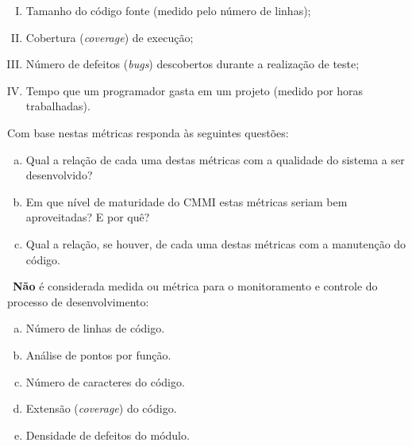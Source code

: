 \begin{enumerate}[I)]
\item Tamanho do código fonte (medido pelo número de linhas);
\item Cobertura ({\em coverage}) de execução;
\item Número de defeitos ({\em bugs}) descobertos durante a realização
  de teste;
\item Tempo que um programador gasta em um projeto (medido por horas trabalhadas).
\end{enumerate}

Com base nestas métricas responda às seguintes questões:

\begin{enumerate}[a)]
\item  Qual a relação de cada uma destas métricas com a qualidade do
  sistema a ser desenvolvido? 
\item Em que nível de maturidade do CMMI estas métricas seriam bem
  aproveitadas? E por quê? 
\item Qual a relação, se houver, de cada uma destas métricas com a
  manutenção do código. 
\end{enumerate}

~{\bf Não} é considerada medida ou métrica para o monitoramento e controle do processo de desenvolvimento:

\begin{enumerate}[a)]
  \item Número de linhas de código.
  \item Análise de pontos por função.
  \item Número de caracteres do código.
  \item Extensão ({\it coverage}) do código.
  \item Densidade de defeitos do módulo.
\end{enumerate}
